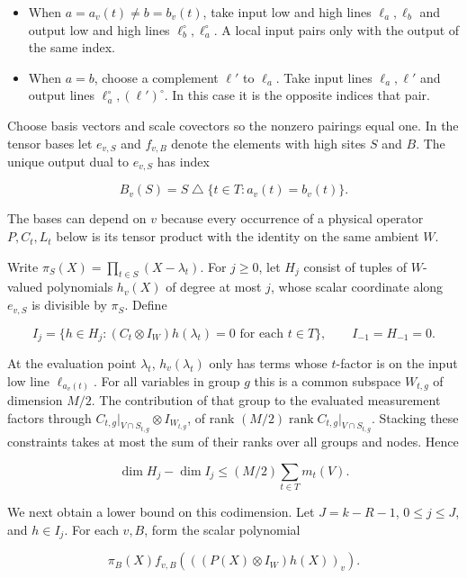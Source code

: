\documentclass[
  10pt,
]{article}
\providecommand{\tightlist}{%
  \setlength{\itemsep}{0pt}\setlength{\parskip}{0pt}}
\begin{document}
\begin{itemize}
\tightlist
\item
  When \(a=a_v(t)\ne b=b_v(t)\), take input low and high lines
  \(\ell_a,\ell_b\) and output low and high lines
  \(\ell_b^\circ,\ell_a^\circ\). A local input pairs only with the
  output of the same index.
\item
  When \(a=b\), choose a complement \(\ell'\) to \(\ell_a\). Take input
  lines \(\ell_a,\ell'\) and output lines
  \(\ell_a^\circ,(\ell')^\circ\). In this case it is the opposite
  indices that pair.
\end{itemize}

Choose basis vectors and scale covectors so the nonzero pairings equal
one. In the tensor bases let \(e_{v,S}\) and \(f_{v,B}\) denote the
elements with high sites \(S\) and \(B\). The unique output dual to
\(e_{v,S}\) has index

\[
 B_v(S)=S\mathbin{\triangle}\{t\in T:a_v(t)=b_v(t)\}.                \tag{8}
\]

The bases can depend on \(v\) because every occurrence of a physical
operator \(P,C_t,L_t\) below is its tensor product with the identity on
the same ambient \(W\).

Write \(\pi_S(X)=\prod_{t\in S}(X-\lambda_t)\). For \(j\ge0\), let
\(H_j\) consist of tuples of \(W\)-valued polynomials \(h_v(X)\) of
degree at most \(j\), whose scalar coordinate along \(e_{v,S}\) is
divisible by \(\pi_S\). Define

\[
 I_j=\{h\in H_j:(C_t\otimes I_W)h(\lambda_t)=0\text{ for each }t\in T\},
 \qquad I_{-1}=H_{-1}=0 .
\]

At the evaluation point \(\lambda_t\), \(h_v(\lambda_t)\) only has terms
whose \(t\)-factor is on the input low line \(\ell_{a_v(t)}\). For all
variables in group \(g\) this is a common subspace \(W_{t,g}\) of
dimension \(M/2\). The contribution of that group to the evaluated
measurement factors through
\(C_{t,g}|_{V\cap S_{t,g}}\otimes I_{W_{t,g}}\), of rank
\((M/2)\operatorname{rank} C_{t,g}|_{V\cap S_{t,g}}\). Stacking these
constraints takes at most the sum of their ranks over all groups and
nodes. Hence

\[
               \dim H_j-\dim I_j\le (M/2)\sum_{t\in T}m_t(V).          \tag{9}
\]

We next obtain a lower bound on this codimension. Let \(J=k-R-1\),
\(0\le j\le J\), and \(h\in I_j\). For each \(v,B\), form the scalar
polynomial

\[
      \pi_B(X)f_{v,B}\!\left(((P(X)\otimes I_W)h(X))_v\right).
\]
\end{document}
